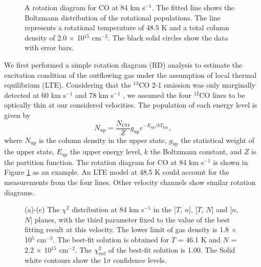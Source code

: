 \begin{figure}[tbp]
\caption{A rotation diagram for CO at 84 km s$^{-1}$. The fitted line shows the Boltzmann distribution of the rotational populations. The line represents a rotational temperature of 48.5 K and a total column density of 2.0 $\times$ 10$^{15}$ cm$^{-2}$. The black solid circles show the data with error bars. \label{fig:figrd}}
\end{figure}

We first performed a simple rotation diagram (RD) analysis \citep{1999ApJ...517..209G} to estimate the excitation condition of the outflowing gas under the assumption of local thermal equilibrium (LTE). Considering that the $^{13}$CO 2-1 emission was only marginally detected at 60 km s$^{-1}$ and 78 km s$^{-1}$ \citep{2009ApJ...696...66Q}, we assumed the four $^{12}$CO lines to be optically thin at our considered velocities. The population of each energy level is given by 
\begin{equation}
N_{\mathrm{up}} = \frac{N_\mathrm{CO}}{Z} g_\mathrm{up} e^{-E_\mathrm{up}/kT_\mathrm{kin}},
\end{equation}
where $N_\mathrm{up}$ is the column density in the upper state, $g_\mathrm{up}$ the statistical weight of the upper state, $E_\mathrm{up}$ the upper energy level, $k$ the Boltzmann constant, and $Z$ is the partition function. The rotation diagram for CO at 84 km s$^{-1}$ is shown in Figure \ref{fig:figrd} as an example. An LTE model at 48.5 K could account for the measurements from the four lines. Other velocity channels show similar rotation diagrams.


\begin{figure}[!tbp]
\caption{(a)-(c) The $\chi^2$ distribution at 84 km s$^{-1}$ in the [$T$, $n$], [$T$, $N$] and [$n$, $N$] planes, with the third parameter fixed to the value of the best fitting result at this velocity. The lower limit of gas density is 1.8 $\times$ 10$^{5}$ cm$^{-3}$. The best-fit solution is obtained for $T$ =  46.1 K and $N$ = 2.2 $\times$ 10$^{15}$ cm$^{-2}$. The $\chi^2_{\mathrm{red}}$ of the best-fit solution is 1.00. The Solid white contours show the 1$\sigma$ confidence levels. \label{fig:figchi}}
\end{figure}

